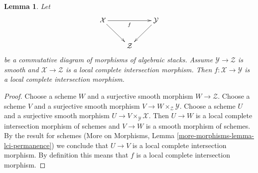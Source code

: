 \documentclass[10pt,a4paper]{amsart}
\theoremstyle{plain}
\newtheorem{lemma}[subsection]{Lemma}
\theoremstyle{definition}
\theoremstyle{remark}
\numberwithin{equation}{subsection}
\begin{document}
\begin{lemma}
\label{lemma-lci-permanence}
Let
$$
\xymatrix{
\mathcal{X} \ar[rr]_f \ar[rd] & & \mathcal{Y} \ar[ld] \\
& \mathcal{Z}
}
$$
be a commutative diagram of morphisms of algebraic stacks.
Assume $\mathcal{Y} \to \mathcal{Z}$ is smooth and
$\mathcal{X} \to \mathcal{Z}$ is a local complete intersection morphism.
Then $f : \mathcal{X} \to \mathcal{Y}$ is a
local complete intersection morphism.
\end{lemma}

\begin{proof}
Choose a scheme $W$ and a surjective smooth morphism $W \to \mathcal{Z}$.
Choose a scheme $V$ and a surjective smooth morphism
$V \to W \times_\mathcal{Z} \mathcal{Y}$.
Choose a scheme $U$ and a surjective smooth morphism
$U \to V \times_\mathcal{Y} \mathcal{X}$.
Then $U \to W$ is a local complete intersection morphism of schemes and
$V \to W$ is a smooth morphism of schemes. By the result for schemes
(More on Morphisms, Lemma \ref{more-morphisms-lemma-lci-permanence})
we conclude that $U \to V$ is a local complete intersection morphism.
By definition this means that $f$ is a local complete intersection morphism.
\end{proof}
\end{document}
